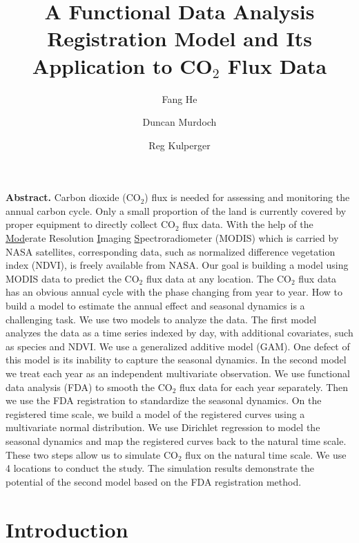 \documentclass{article}
\begin{document}
\title{A Functional Data Analysis Registration Model and Its Application to CO$_2$ Flux Data}

\author[1]{Fang He}
\author[2]{Duncan Murdoch}
\author[2]{Reg Kulperger}
 
\maketitle

\textbf{Abstract.}  Carbon dioxide (CO$_2$) flux is needed for assessing and monitoring the annual carbon cycle. Only a small proportion of the land is currently covered by proper equipment to directly collect CO$_2$ flux data. With the help of the \underline{Mod}erate Resolution \underline{I}maging \underline{S}pectroradiometer (MODIS) which is carried by NASA satellites, corresponding data, such as normalized difference vegetation index (NDVI), is freely available from NASA. Our goal is building a model using MODIS data to predict the CO$_2$ flux data at any location. The CO$_2$ flux data has an obvious annual cycle with the phase changing from year to year. How to build a model to estimate the annual effect and seasonal dynamics is a challenging task. We use two models to analyze the data. The first model analyzes the data as a time series indexed by day, with additional covariates, such as species and NDVI. We use a  generalized additive model (GAM). One defect of this model is its inability to capture the seasonal dynamics. In the second model we treat each year as an independent multivariate observation. We use functional data analysis (FDA) to smooth the CO$_2$ flux data for each year separately. Then we use the FDA registration to standardize the seasonal dynamics. On the registered time scale, we build a model of the registered curves using a multivariate normal distribution. We use Dirichlet regression to model the seasonal dynamics and map the registered curves back to the natural time scale. These two steps allow us to simulate CO$_2$ flux on the natural time scale. We use 4 locations to conduct the study. The simulation results demonstrate the potential of the second model based on the FDA registration method.

\newpage

\tableofcontents

\newpage

\section{Introduction}
\end{document}
